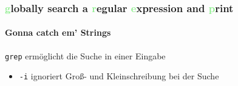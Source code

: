 \documentclass[12pt,utf8]{beamer}
\begin{document}
\begin{frame}
	\frametitle{\Large{\textcolor{lightGreen}{g}lobally search a \textcolor{lightGreen}{r}egular \textcolor{lightGreen}{e}xpression and \textcolor{lightGreen}{p}rint}}
	\framesubtitle{Gonna catch em' Strings}
	\texttt{grep} ermöglicht die Suche in einer Eingabe
	\begin{itemize}
		\item \texttt{-i} ignoriert Groß- und Kleinschreibung bei der Suche
	\end{itemize}
\end{frame}

%				
%					
\end{document}
